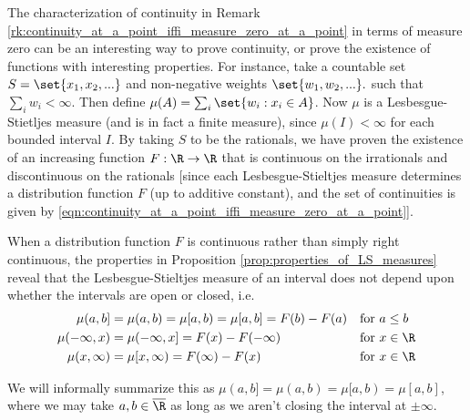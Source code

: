 \documentclass{article} %
\begin{document}
\begin{remark}
The characterization of continuity in Remark \ref{rk:continuity_at_a_point_iffi_measure_zero_at_a_point} in terms of measure zero can be an interesting way to prove continuity, or prove the existence of functions with interesting properties.   For instance, take a countable set $S = \set{x_1, x_2, ...}$ and non-negative weights $\set{w_1, w_2, ...}.$ such that $\sum_i w_i < \infty$.   Then define $\mu(A) = \sum_{i} \set{w_i : x_i \in A}$.  Now $\mu$ is a Lesbesgue-Stietljes measure (and is in fact a finite measure), since $\mu(I) < \infty$ for each bounded interval $I$. By taking $S$ to be the rationals, we have proven the existence of an increasing function $F : \R \to \R$ that is continuous on the irrationals and discontinuous on the rationals {\footnotesize [since each Lesbesgue-Stieltjes measure determines a distribution function $F$ (up to additive constant), and the set of continuities is given by \eqref{eqn:continuity_at_a_point_iffi_measure_zero_at_a_point}]}.
\end{remark}

\begin{remark}{}
When a distribution function $F$ is continuous rather than simply right continuous, the properties in Proposition \ref{prop:properties_of_LS_measures} reveal that the Lesbesgue-Stieltjes measure of an interval does not depend upon whether the intervals are open or closed, i.e. 
\begin{subequations}
\begin{align}
\mu(a,b] &= \mu(a,b) = \mu[a,b) = \mu[a,b] = F(b)-F(a) &&  \text{for } a \leq b \\
\mu(-\infty,x) &= \mu(-\infty,x] = F(x) - F(-\infty) && \text{for } x \in \R  \\
\mu(x,\infty) &= \mu[x,\infty) = F(\infty) - F(x) && \text{for } x \in \R  
\end{align}
\label{eqn:LS_measures_with_continuous_distribution_function_dont_care_about_intervals_being_open_or_closed}
\end{subequations}

We will informally summarize this as $\mu(a,b]=\mu(a,b)=\mu[a,b)=\mu[a,b]$, where we may take $a,b \in \overline{\R}$ as long as we aren't closing the interval at $\pm \infty$.
\label{rk:LS_measures_with_continuous_distribution_function_agnostic_to_open_vs_closed_intervals}
\end{remark}
\end{document}
